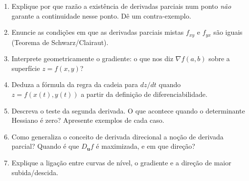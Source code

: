\documentclass[12pt,a4paper]{article}
\theoremstyle{definition}
\theoremstyle{remark}
\begin{document}
\begin{enumerate}
  \item Explique por que razão a existência de derivadas parciais num ponto
        \emph{não} garante a continuidade nesse ponto. Dê um contra-exemplo.
  \item Enuncie as condições em que as derivadas parciais mistas $f_{xy}$
        e $f_{yx}$ são iguais (Teorema de Schwarz/Clairaut).
  \item Interprete geometricamente o gradiente: o que nos diz $\nabla f(a,b)$
        sobre a superfície $z=f(x,y)$?
  \item Deduza a fórmula da regra da cadeia para $dz/dt$ quando
        $z=f(x(t),y(t))$ a partir da definição de diferenciabilidade.
  \item Descreva o teste da segunda derivada. O que acontece quando o
        determinante Hessiano é zero? Apresente exemplos de cada caso.
  \item Como generaliza o conceito de derivada direcional a noção de
        derivada parcial? Quando é que $D_{\mathbf{u}}f$ é maximizada, e em
        que direção?
  \item Explique a ligação entre curvas de nível, o gradiente e a direção
        de maior subida/descida.
\end{enumerate}
\end{document}
